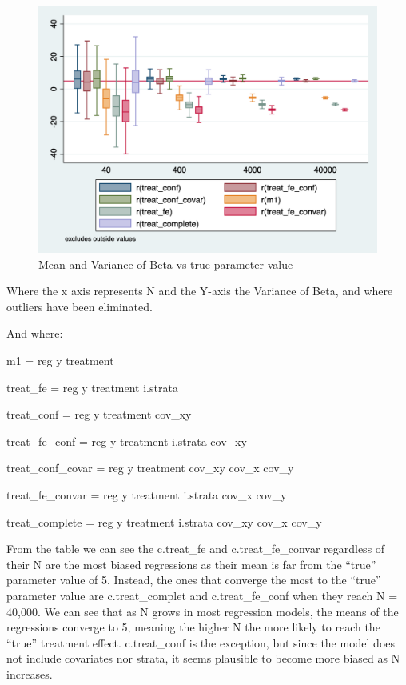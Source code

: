 \documentclass[
]{article}
\begin{document}
\begin{figure}
\centering
\includegraphics{img/biasbox.png}
\caption{Mean and Variance of Beta vs true parameter value}
\end{figure}

Where the x axis represents N and the Y-axis the Variance of Beta, and
where outliers have been eliminated.

And where:

m1 = reg y treatment

treat\_fe = reg y treatment i.strata

treat\_conf = reg y treatment cov\_xy

treat\_fe\_conf = reg y treatment i.strata cov\_xy

treat\_conf\_covar = reg y treatment cov\_xy cov\_x cov\_y

treat\_fe\_convar = reg y treatment i.strata cov\_x cov\_y

treat\_complete = reg y treatment i.strata cov\_xy cov\_x cov\_y

From the table we can see the c.treat\_fe and c.treat\_fe\_convar
regardless of their N are the most biased regressions as their mean is
far from the ``true'' parameter value of 5. Instead, the ones that
converge the most to the ``true'' parameter value are c.treat\_complet
and c.treat\_fe\_conf when they reach N = 40,000. We can see that as N
grows in most regression models, the means of the regressions converge
to 5, meaning the higher N the more likely to reach the ``true''
treatment effect. c.treat\_conf is the exception, but since the model
does not include covariates nor strata, it seems plausible to become
more biased as N increases.
\end{document}
